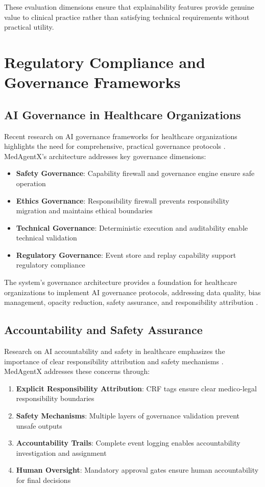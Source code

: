 \documentclass[journal]{IEEEtran}
\begin{document}
These evaluation dimensions ensure that explainability features provide genuine value to clinical practice rather than satisfying technical requirements without practical utility.

\newpage
\section{Regulatory Compliance and Governance Frameworks}

\subsection{AI Governance in Healthcare Organizations}
Recent research on AI governance frameworks for healthcare organizations highlights the need for comprehensive, practical governance protocols \cite{ai_governance_healthcare_2024}. MedAgentX's architecture addresses key governance dimensions:

\begin{itemize}
    \item \textbf{Safety Governance}: Capability firewall and governance engine ensure safe operation
    \item \textbf{Ethics Governance}: Responsibility firewall prevents responsibility migration and maintains ethical boundaries
    \item \textbf{Technical Governance}: Deterministic execution and auditability enable technical validation
    \item \textbf{Regulatory Governance}: Event store and replay capability support regulatory compliance
\end{itemize}

The system's governance architecture provides a foundation for healthcare organizations to implement AI governance protocols, addressing data quality, bias management, opacity reduction, safety assurance, and responsibility attribution \cite{ethics_governance_medical_ai_2023}.

\subsection{Accountability and Safety Assurance}
Research on AI accountability and safety in healthcare emphasizes the importance of clear responsibility attribution and safety mechanisms \cite{ai_accountability_healthcare_2020}. MedAgentX addresses these concerns through:

\begin{enumerate}
    \item \textbf{Explicit Responsibility Attribution}: CRF tags ensure clear medico-legal responsibility boundaries
    \item \textbf{Safety Mechanisms}: Multiple layers of governance validation prevent unsafe outputs
    \item \textbf{Accountability Trails}: Complete event logging enables accountability investigation and assignment
    \item \textbf{Human Oversight}: Mandatory approval gates ensure human accountability for final decisions
\end{enumerate}
\end{document}
